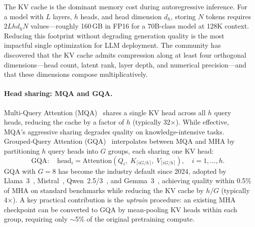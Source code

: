 \documentclass[11pt,a4paper]{article}
\begin{document}
The KV cache is the dominant memory cost during autoregressive inference. For a model with $L$ layers, $h$ heads, and head dimension $d_h$, storing $N$ tokens requires $2Lhd_h N$ values---roughly 160\,GB in FP16 for a 70B-class model at 128K context. Reducing this footprint without degrading generation quality is the most impactful single optimization for LLM deployment. The community has discovered that the KV cache admits compression along at least four orthogonal dimensions---head count, latent rank, layer depth, and numerical precision---and that these dimensions compose multiplicatively.

\paragraph{Head sharing: MQA and GQA.}
Multi-Query Attention (MQA)~\cite{shazeer2019fast} shares a single KV head across all $h$ query heads, reducing the cache by a factor of $h$ (typically 32$\times$). While effective, MQA's aggressive sharing degrades quality on knowledge-intensive tasks. Grouped-Query Attention (GQA)~\cite{ainslie2023gqa} interpolates between MQA and MHA by partitioning $h$ query heads into $G$ groups, each sharing one KV head:
\begin{equation}
\text{GQA}: \quad \text{head}_i = \text{Attention}(Q_i,\; K_{\lceil iG/h \rceil},\; V_{\lceil iG/h \rceil}), \quad i = 1, \ldots, h.
\end{equation}
GQA with $G = 8$ has become the industry default since 2024, adopted by Llama~3~\cite{grattafiori2024llama3}, Mistral~\cite{jiang2023mistral}, Qwen~2.5/3~\cite{yang2024qwen25,yang2025qwen3}, and Gemma~3~\cite{gemma2025gemma3}, achieving quality within 0.5\% of MHA on standard benchmarks while reducing the KV cache by $h/G$ (typically 4$\times$). A key practical contribution is the \emph{uptrain} procedure: an existing MHA checkpoint can be converted to GQA by mean-pooling KV heads within each group, requiring only $\sim$5\% of the original pretraining compute.
\end{document}
